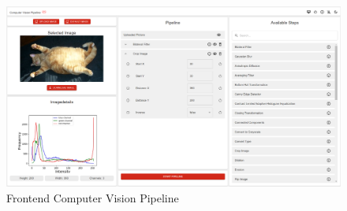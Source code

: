 \documentclass[conference]{IEEEtran}
\begin{document}
\begin{figure}[ht]
    \centering
    \includegraphics[width=\textheight, angle=90, keepaspectratio]{Bilder/frontend_webseite}
    \caption{Frontend Computer Vision Pipeline}
    \label{fig:webseite}
\end{figure}
\end{document}
